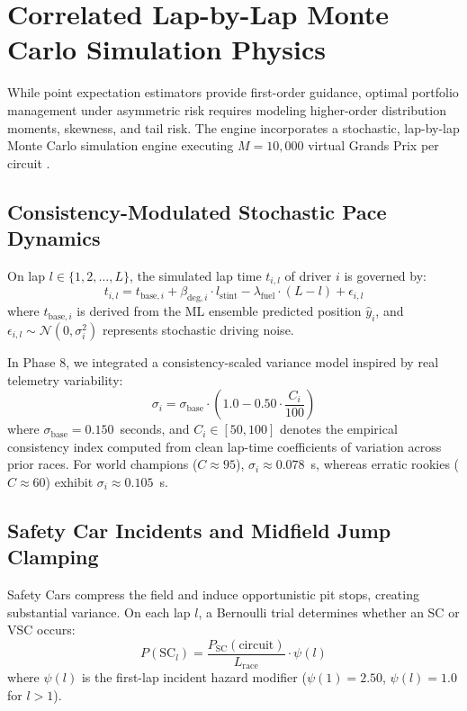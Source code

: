 \section{Correlated Lap-by-Lap Monte Carlo Simulation Physics}
\label{sec:monte_carlo_physics}

While point expectation estimators provide first-order guidance, optimal portfolio management under asymmetric risk requires modeling higher-order distribution moments, skewness, and tail risk. The engine incorporates a stochastic, lap-by-lap Monte Carlo simulation engine executing $M = 10,000$ virtual Grands Prix per circuit \cite{bekker2009stochastic}.

\subsection{Consistency-Modulated Stochastic Pace Dynamics}
On lap $l \in \{1, 2, \dots, L\}$, the simulated lap time $t_{i, l}$ of driver $i$ is governed by:
\begin{equation}
t_{i, l} = t_{\text{base}, i} + \beta_{\text{deg}, i} \cdot l_{\text{stint}} - \lambda_{\text{fuel}} \cdot (L - l) + \epsilon_{i, l}
\label{eq:sim_lap_time}
\end{equation}
where $t_{\text{base}, i}$ is derived from the ML ensemble predicted position $\hat{y}_i$, and $\epsilon_{i, l} \sim \mathcal{N}(0, \sigma_i^2)$ represents stochastic driving noise.

In Phase 8, we integrated a consistency-scaled variance model inspired by real telemetry variability:
\begin{equation}
\sigma_i = \sigma_{\text{base}} \cdot \left( 1.0 - 0.50 \cdot \frac{C_i}{100} \right)
\label{eq:consistency_sigma}
\end{equation}
where $\sigma_{\text{base}} = 0.150$~seconds, and $C_i \in [50, 100]$ denotes the empirical consistency index computed from clean lap-time coefficients of variation across prior races. For world champions ($C \approx 95$), $\sigma_i \approx 0.078$~s, whereas erratic rookies ($C \approx 60$) exhibit $\sigma_i \approx 0.105$~s.

\subsection{Safety Car Incidents and Midfield Jump Clamping}
Safety Cars compress the field and induce opportunistic pit stops, creating substantial variance. On each lap $l$, a Bernoulli trial determines whether an SC or VSC occurs:
\begin{equation}
P(\text{SC}_l) = \frac{P_{\text{SC}}(\text{circuit})}{L_{\text{race}}} \cdot \psi(l)
\label{eq:sc_hazard}
\end{equation}
where $\psi(l)$ is the first-lap incident hazard modifier ($\psi(1) = 2.50$, $\psi(l) = 1.0$ for $l > 1$).


